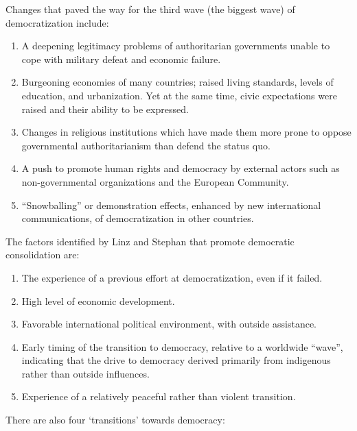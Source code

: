 
Changes that paved the way for the third wave (the biggest wave) of
democratization include:

\begin{enumerate}
\item A deepening legitimacy problems of authoritarian governments
  unable to cope with military defeat and economic failure.
\item Burgeoning economies of many countries; raised living
  standards, levels of education, and urbanization. Yet at the same time,
  civic expectations were raised and their ability to be expressed.
\item Changes in religious institutions which have made them more
  prone to oppose governmental authoritarianism than defend the status
  quo.
\item A push to promote human rights and democracy by external actors
  such as non-governmental organizations and the European Community.
\item ``Snowballing'' or demonstration effects, enhanced by new
  international communications, of democratization in other countries.
\end{enumerate}

The factors identified by Linz and Stephan that promote democratic
consolidation are:

\begin{enumerate}
  \item The experience of a previous effort at democratization, even if
    it failed.
  \item High level of economic development.
  \item Favorable international political environment, with outside
    assistance.
  \item Early timing of the transition to democracy, relative to a
    worldwide ``wave'', indicating that the drive to democracy derived
    primarily from indigenous rather than outside influences.
  \item Experience of a relatively peaceful rather than violent
    transition.
\end{enumerate}

There are also four `transitions' towards democracy:

